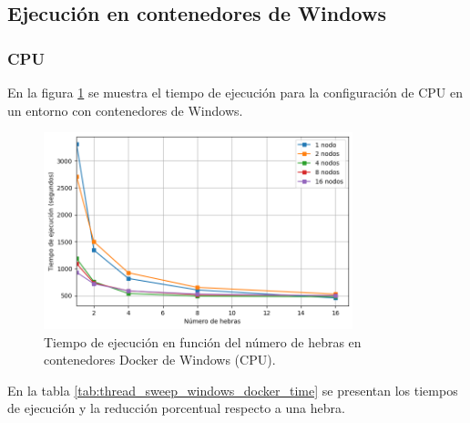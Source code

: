 \subsection{Ejecución en contenedores de Windows}
\subsubsection{CPU}

En la figura \ref{fig:thread_sweep_windows_docker_time} se muestra el tiempo de ejecución para la configuración de CPU en un entorno con contenedores de Windows.

\begin{figure}[H]
    \centering
    \includegraphics[width=0.8\textwidth]{imagenes/cap5/thread_sweep_windows_docker_time.png}
    \caption{Tiempo de ejecución en función del número de hebras en contenedores Docker de Windows (CPU).}
    \label{fig:thread_sweep_windows_docker_time}
\end{figure}

En la tabla \ref{tab:thread_sweep_windows_docker_time} se presentan los tiempos de ejecución y la reducción porcentual respecto a una hebra.

